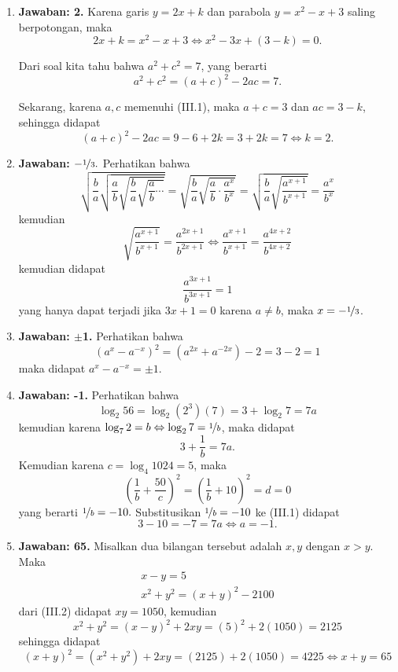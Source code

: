 \begin{enumerate}
\item \textbf{Jawaban: 2.} Karena garis $y=2x+k$ dan parabola $y=x^2-x+3$ saling berpotongan, maka \setcounter{equation}{0}\begin{equation}2x+k = x^2-x+3 \Leftrightarrow x^2-3x+(3-k) = 0.\end{equation} \par Dari soal kita tahu bahwa $a^2 + c^2 = 7$, yang berarti $$a^2 + c^2 = (a+c)^2 - 2ac = 7.$$\par Sekarang, karena $a,c$ memenuhi (III.1), maka $a+c = 3$ dan $ac = 3-k$, sehingga didapat $$(a+c)^2-2ac = 9-6+2k = 3+2k = 7\Leftrightarrow k = 2.$$

\item \textbf{Jawaban: $-\nicefrac{1}{3}.$} Perhatikan bahwa $$\sqrt{\frac{b}{a}\sqrt{\frac{a}{b}\sqrt{\frac{b}{a}\sqrt{\frac{a}{b}\cdots}}}} = \sqrt{\frac{b}{a}\sqrt{\frac{a}{b}\cdot \frac{a^x}{b^x}}} = \sqrt{\frac{b}{a}\sqrt{\frac{a^{x+1}}{b^{x+1}}}} = \frac{a^x}{b^x}$$kemudian$$\sqrt{\frac{a^{x+1}}{b^{x+1}}} = \frac{a^{2x+1}}{b^{2x+1}}\Leftrightarrow \frac{a^{x+1}}{b^{x+1}} = \frac{a^{4x+2}}{b^{4x+2}}$$kemudian didapat $$\frac{a^{3x+1}}{b^{3x+1}} = 1$$yang hanya dapat terjadi jika $3x+1 = 0$ karena $a\neq b$, maka $x=-\nicefrac{1}{3}$.

\item \textbf{Jawaban: $\pm$1.} Perhatikan bahwa $$(a^x - a^{-x})^2 = (a^{2x} + a^{-2x}) - 2 = 3-2 = 1$$maka didapat $a^x - a^{-x} = \pm1.$

\item \textbf{Jawaban: -1.} Perhatikan bahwa $$\log_2 56 = \log_2 (2^3)(7) = 3+\log_2 7 = 7a$$kemudian karena $\log_7 2 = b\Leftrightarrow \log_2 7 = \nicefrac{1}{b}$, maka didapat \setcounter{equation}{0}\begin{equation}3+\frac{1}{b} = 7a.\end{equation}Kemudian karena $c = \log_4 1024 = 5$, maka $$\left(\frac{1}{b} + \frac{50}{c}\right)^2 = \left(\frac{1}{b} + 10\right)^2 = d = 0$$yang berarti $\nicefrac{1}{b} = -10.$ Substitusikan $\nicefrac{1}{b} = -10$ ke (III.1) didapat $$3 - 10 = -7 = 7a\Leftrightarrow a = -1.$$

\item \textbf{Jawaban: 65.} Misalkan dua bilangan tersebut adalah $x,y$ dengan $x>y$. Maka
	\setcounter{equation}{0}\begin{gather}
	x-y = 5\\
	x^2+y^2 = (x+y)^2 - 2100
	\end{gather}
dari (III.2) didapat $xy = 1050$, kemudian $$x^2+y^2 = (x-y)^2+2xy = (5)^2 + 2(1050) = 2125$$sehingga didapat $$(x+y)^2 = (x^2+y^2) + 2xy = (2125)+2(1050) = 4225\Leftrightarrow  x+y = 65$$


\end{enumerate}
